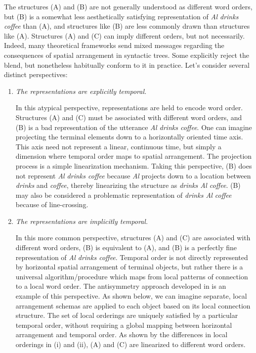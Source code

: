 The structures (A) and (B) are not generally understood as different word orders, but (B) is a somewhat less aesthetically satisfying representation of \textit{Al drinks coffee} than (A), and structures like (B) are less commonly drawn than structures like (A). Structures (A) and (C) can imply different orders, but not necessarily. Indeed, many theoretical frameworks send mixed messages regarding the consequences of spatial arrangement in syntactic trees. Some explicitly reject the blend, but nonetheless habitually conform to it in practice. Let's consider several distinct perspectives:

\begin{enumerate}
\item \textit{The representations are explicitly temporal.}

  In this atypical perspective, representations are held to encode word order. Structures (A) and (C) must be associated with different word orders, and (B) is a bad representation of the utterance \textit{Al drinks coffee}. One can imagine projecting the terminal elements down to a horizontally oriented time axis. This axis need not represent a linear, continuous time, but simply a dimension where temporal order maps to spatial arrangement. The projection process is a simple linearization mechanism. Taking this perspective, (B) does not represent \textit{Al drinks coffee} because \textit{Al} projects down to a location between \textit{drinks} and \textit{coffee}, thereby linearizing the structure as \textit{drinks Al coffee}. (B) may also be considered a problematic representation of \textit{drinks Al coffee} because of line-crossing.

\item \textit{The representations are implicitly temporal.}

  In this more common perspective, structures (A) and (C) are associated with different word orders, (B) is equivalent to (A), and (B) is a perfectly fine representation of \textit{Al drinks coffee}. Temporal order is not directly represented by horizontal spatial arrangement of terminal objects, but rather there is a universal algorithm/procedure which maps from local patterns of connection to a local word order. The antisymmetry approach developed in \citet{Kayne1994} is an example of this perspective. As shown below, we can imagine separate, local arrangement schemas are applied to each object based on its local connection structure. The set of local orderings are uniquely satisfied by a particular temporal order, without requiring a global mapping between horizontal arrangement and temporal order. As shown by the differences in local orderings in {} (i) and (ii), {}(A) and (C) are linearized to different word orders.


\end{enumerate}

